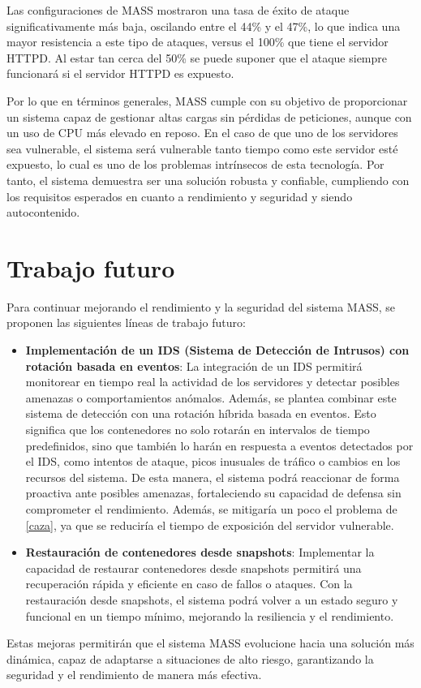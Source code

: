 Las configuraciones de MASS mostraron una tasa de éxito de ataque significativamente más baja, oscilando entre el 44\% y el 47\%, lo que indica una mayor resistencia a este tipo de ataques, versus el 100\% que tiene el servidor HTTPD. Al estar tan cerca del 50\% se puede suponer que el ataque siempre funcionará si el servidor HTTPD es expuesto.

Por lo que en términos generales, MASS cumple con su objetivo de proporcionar un sistema capaz de gestionar altas cargas sin pérdidas de peticiones, aunque con un uso de CPU más elevado en reposo. En el caso de que uno de los servidores sea vulnerable, el sistema será vulnerable tanto tiempo como este servidor esté expuesto, lo cual es uno de los problemas intrínsecos de esta tecnología. Por tanto, el sistema demuestra ser una solución robusta y confiable, cumpliendo con los requisitos esperados en cuanto a rendimiento y seguridad y siendo autocontenido.


\section{Trabajo futuro}
Para continuar mejorando el rendimiento y la seguridad del sistema MASS, se proponen las siguientes líneas de trabajo futuro:
\begin{itemize}
    \item \textbf{Implementación de un IDS (Sistema de Detección de Intrusos) con rotación basada en eventos}: La integración de un IDS permitirá monitorear en tiempo real la actividad de los servidores y detectar posibles amenazas o comportamientos anómalos. Además, se plantea combinar este sistema de detección con una rotación híbrida basada en eventos. Esto significa que los contenedores no solo rotarán en intervalos de tiempo predefinidos, sino que también lo harán en respuesta a eventos detectados por el IDS, como intentos de ataque, picos inusuales de tráfico o cambios en los recursos del sistema. De esta manera, el sistema podrá reaccionar de forma proactiva ante posibles amenazas, fortaleciendo su capacidad de defensa sin comprometer el rendimiento. Además, se mitigaría un poco el problema de \ref{caza}, ya que se reduciría el tiempo de exposición del servidor vulnerable.
    \item \textbf{Restauración de contenedores desde snapshots}: Implementar la capacidad de restaurar contenedores desde snapshots permitirá una recuperación rápida y eficiente en caso de fallos o ataques. Con la restauración desde snapshots, el sistema podrá volver a un estado seguro y funcional en un tiempo mínimo, mejorando la resiliencia y el rendimiento.
\end{itemize}

Estas mejoras permitirán que el sistema MASS evolucione hacia una solución más dinámica, capaz de adaptarse a situaciones de alto riesgo, garantizando la seguridad y el rendimiento de manera más efectiva.